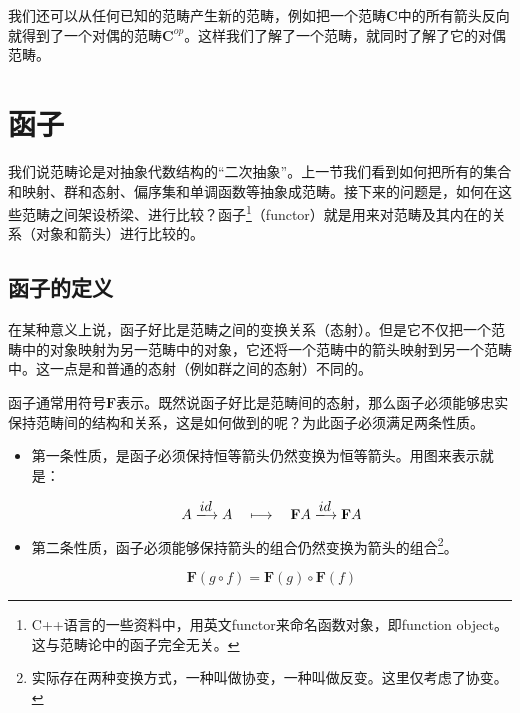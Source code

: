 \documentclass{article}
\begin{document}
我们还可以从任何已知的范畴产生新的范畴，例如把一个范畴$\pmb{C}$中的所有箭头反向就得到了一个对偶的范畴$\pmb{C}^{op}$。这样我们了解了一个范畴，就同时了解了它的对偶范畴。

\section{函子}
我们说范畴论是对抽象代数结构的“二次抽象”。上一节我们看到如何把所有的集合和映射、群和态射、偏序集和单调函数等抽象成范畴。接下来的问题是，如何在这些范畴之间架设桥梁、进行比较？函子\footnote{C++语言的一些资料中，用英文functor来命名函数对象，即function object。这与范畴论中的函子完全无关。}（functor）就是用来对范畴及其内在的关系（对象和箭头）进行比较的。

\subsection{函子的定义}

在某种意义上说，函子好比是范畴之间的变换关系（态射）。但是它不仅把一个范畴中的对象映射为另一范畴中的对象，它还将一个范畴中的箭头映射到另一个范畴中。这一点是和普通的态射（例如群之间的态射）不同的。

函子通常用符号$\mathbf{F}$表示。既然说函子好比是范畴间的态射，那么函子必须能够忠实保持范畴间的结构和关系，这是如何做到的呢？为此函子必须满足两条性质。

\begin{itemize}
\item 第一条性质，是函子必须保持恒等箭头仍然变换为恒等箭头。用图来表示就是：

\[
A \arrowto{id} A \quad \longmapsto \quad \mathbf{F}A \arrowto{id} \mathbf{F}A
\]

\item 第二条性质，函子必须能够保持箭头的组合仍然变换为箭头的组合\footnote{实际存在两种变换方式，一种叫做协变，一种叫做反变。这里仅考虑了协变。}。

\begin{center}
\end{center}

\[
\mathbf{F}(g \circ f) = \mathbf{F}(g) \circ \mathbf{F}(f)
\]
\end{itemize}
\end{document}
